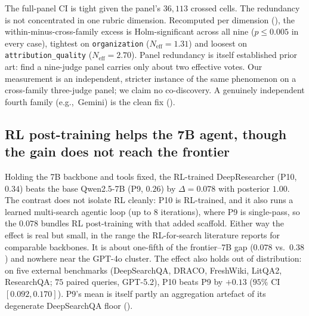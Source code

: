 \documentclass[11pt]{article}
\newcommand{\dimrow}[1]{\texttt{#1}}
\newcommand{\eg}{e.g.,\ }
\begin{document}
The full-panel CI is tight given the panel's $36{,}113$ crossed cells. The redundancy is not
concentrated in one rubric dimension. Recomputed per dimension (), the
within-minus-cross-family excess is Holm-significant across all nine ($p\leq0.005$ in
every case), tightest on \dimrow{organization} ($N_{\text{eff}}=1.31$) and loosest on
\dimrow{attribution\_quality} ($N_{\text{eff}}=2.70$). Panel redundancy is itself
established prior art: \citet{kohli2026ninejudges} find a nine-judge panel carries only
about two effective votes. Our measurement is an independent, stricter instance of the
same phenomenon on a cross-family three-judge panel; we claim no co-discovery. A
genuinely independent fourth family (\eg Gemini) is the clean fix ().

\begin{table}[H]\centering
\caption{Effective-judge count per rubric dimension. $\phi_{\mathrm{Opus,Son}}$ is the
same-lab (within-family) pairwise verdict correlation, $\phi_{\mathrm{GPT,Claude}}$ the
cross-family average; $\Delta_{\mathrm{w-c}}$ is the within-minus-cross excess, Holm-corrected
across the nine dimensions. All nine clear the correction.}
\label{tab:p2neff}

\end{table}
\FloatBarrier

\subsection{RL post-training helps the 7B agent, though the gain does not reach the frontier}
Holding the 7B backbone and tools fixed, the RL-trained DeepResearcher (P10, $0.34$)
beats the base Qwen2.5-7B (P9, $0.26$) by $\Delta=0.078$ with posterior $1.00$. The
contrast does not isolate RL cleanly: P10 is RL-trained, and it also runs a learned
multi-search agentic loop (up to $8$ iterations), where P9 is single-pass, so the $0.078$
bundles RL post-training with that added scaffold. Either
way the effect is real but small, in the range the RL-for-search literature reports for
comparable backbones. It is about one-fifth of the frontier--7B gap ($0.078$ vs.\
$0.38$) and nowhere near the GPT-4o cluster. The effect also holds out of distribution:
on five external benchmarks (DeepSearchQA, DRACO, FreshWiki, LitQA2, ResearchQA; $75$
paired queries, GPT-5.2), P10 beats P9 by $+0.13$ ($95\%$ CI $[0.092,0.170]$). P9's mean is itself partly an
aggregation artefact of its degenerate DeepSearchQA floor (\Cref{sec:failures}).
\end{document}
